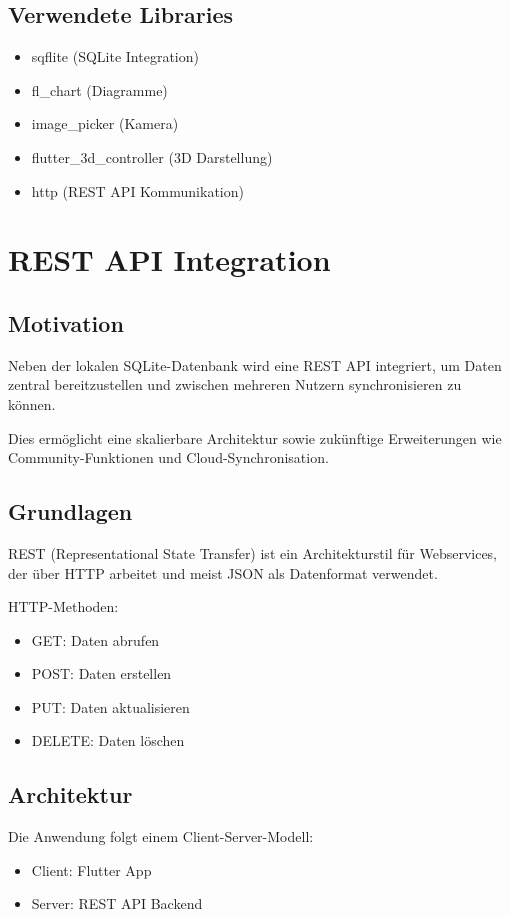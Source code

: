 \documentclass[a4paper,12pt]{article}
\begin{document}
\subsection{Verwendete Libraries}
\begin{itemize}
\item sqflite (SQLite Integration)
\item fl\_chart (Diagramme)
\item image\_picker (Kamera)
\item flutter\_3d\_controller (3D Darstellung)
\item http (REST API Kommunikation)
\end{itemize}

\section{REST API Integration}

\subsection{Motivation}
Neben der lokalen SQLite-Datenbank wird eine REST API integriert, um Daten zentral bereitzustellen und zwischen mehreren Nutzern synchronisieren zu können.

Dies ermöglicht eine skalierbare Architektur sowie zukünftige Erweiterungen wie Community-Funktionen und Cloud-Synchronisation.

\subsection{Grundlagen}
REST (Representational State Transfer) ist ein Architekturstil für Webservices, der über HTTP arbeitet und meist JSON als Datenformat verwendet.

HTTP-Methoden:
\begin{itemize}
\item GET: Daten abrufen
\item POST: Daten erstellen
\item PUT: Daten aktualisieren
\item DELETE: Daten löschen
\end{itemize}

\subsection{Architektur}
Die Anwendung folgt einem Client-Server-Modell:
\begin{itemize}
\item Client: Flutter App
\item Server: REST API Backend
\end{itemize}
\end{document}
